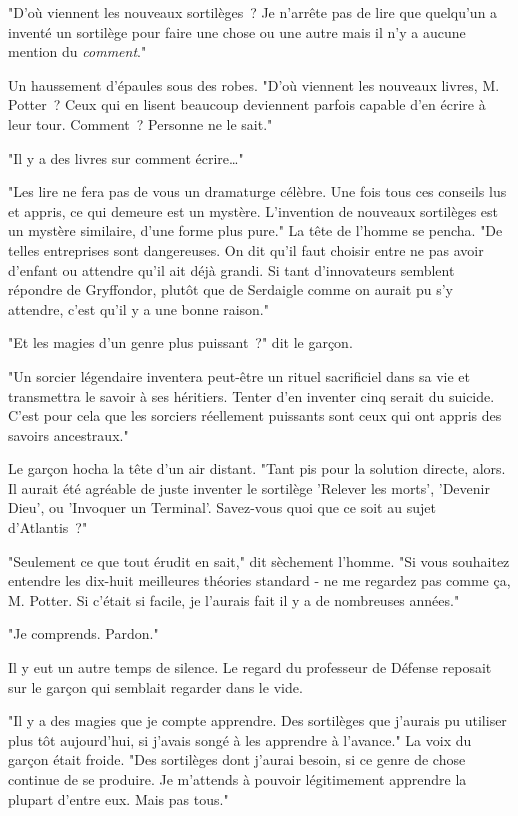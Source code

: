 "D'où viennent les nouveaux sortilèges~? Je n'arrête pas de lire que quelqu'un a inventé un sortilège pour faire une chose ou une autre mais il n'y a aucune mention du \emph{comment}."

Un haussement d'épaules sous des robes. "D'où viennent les nouveaux livres, M. Potter~? Ceux qui en lisent beaucoup deviennent parfois capable d'en écrire à leur tour. Comment~? Personne ne le sait."

"Il y a des livres sur comment écrire…"

"Les lire ne fera pas de vous un dramaturge célèbre. Une fois tous ces conseils lus et appris, ce qui demeure est un mystère. L'invention de nouveaux sortilèges est un mystère similaire, d'une forme plus pure." La tête de l'homme se pencha. "De telles entreprises sont dangereuses. On dit qu'il faut choisir entre ne pas avoir d'enfant ou attendre qu'il ait déjà grandi. Si tant d'innovateurs semblent répondre de Gryffondor, plutôt que de Serdaigle comme on aurait pu s'y attendre, c'est qu'il y a une bonne raison."

"Et les magies d'un genre plus puissant~?" dit le garçon.

"Un sorcier légendaire inventera peut-être un rituel sacrificiel dans sa vie et transmettra le savoir à ses héritiers. Tenter d'en inventer cinq serait du suicide. C'est pour cela que les sorciers réellement puissants sont ceux qui ont appris des savoirs ancestraux."

Le garçon hocha la tête d'un air distant. "Tant pis pour la solution directe, alors. Il aurait été agréable de juste inventer le sortilège 'Relever les morts', 'Devenir Dieu', ou 'Invoquer un Terminal'. Savez-vous quoi que ce soit au sujet d'Atlantis~?"

"Seulement ce que tout érudit en sait," dit sèchement l'homme. "Si vous souhaitez entendre les dix-huit meilleures théories standard - ne me regardez pas comme ça, M. Potter. Si c'était si facile, je l'aurais fait il y a de nombreuses années."

"Je comprends. Pardon."

Il y eut un autre temps de silence. Le regard du professeur de Défense reposait sur le garçon qui semblait regarder dans le vide.

"Il y a des magies que je compte apprendre. Des sortilèges que j'aurais pu utiliser plus tôt aujourd'hui, si j'avais songé à les apprendre à l'avance." La voix du garçon était froide. "Des sortilèges dont j'aurai besoin, si ce genre de chose continue de se produire. Je m'attends à pouvoir légitimement apprendre la plupart d'entre eux. Mais pas tous."

